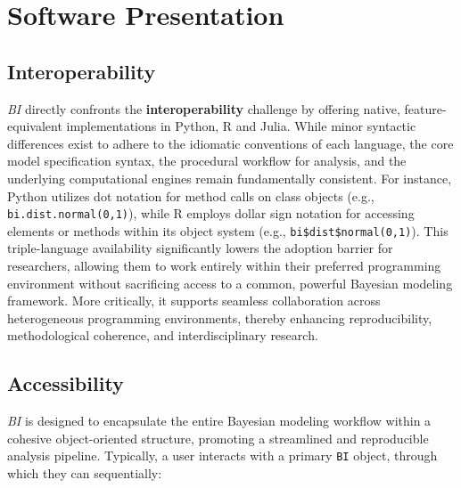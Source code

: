 \documentclass[num-refs]{wiley-article}
\begin{document}
\section{Software Presentation}\label{software-presentation}
\subsection{Interoperability}\label{Interoperability}
\textit{BI} directly confronts the \textbf{interoperability} challenge by offering native, feature-equivalent implementations in Python, R and Julia. While minor syntactic differences exist to adhere to the idiomatic conventions of each language, the core model specification syntax, the procedural workflow for analysis, and the underlying computational engines remain fundamentally consistent. For instance, Python utilizes dot notation for method calls on class objects (e.g., \texttt{bi.dist.normal(0,1)}), while R employs dollar sign notation for accessing elements or methods within its object system (e.g., \texttt{bi\$dist\$normal(0,1)}). This triple-language availability significantly lowers the adoption barrier for researchers, allowing them to work entirely within their preferred programming environment without sacrificing access to a common, powerful Bayesian modeling framework. More critically, it supports seamless collaboration across heterogeneous programming environments, thereby enhancing reproducibility, methodological coherence, and interdisciplinary research.

\subsection{Accessibility}\label{Accessibility}
\textit{BI} is designed to encapsulate the entire Bayesian modeling workflow within a cohesive object-oriented structure, promoting a streamlined and reproducible analysis pipeline. Typically, a user interacts with a primary \texttt{BI} object, through which they can sequentially:
\end{document}
